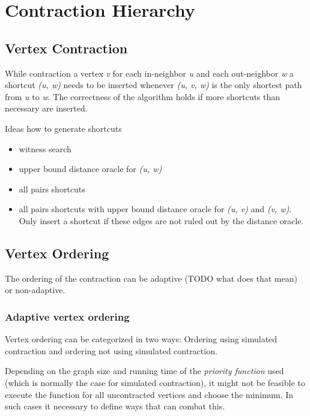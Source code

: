 \chapter{Contraction Hierarchy}



\section{Vertex Contraction}
While contraction a vertex \emph{v} for each in-neighbor \emph{u} and each out-neighbor \emph{w} a shortcut \emph{(u, w)} needs to be inserted whenever \emph{(u, v, w)} is the only shortest path from \emph{u} to \emph{w}.
The correctness of the algorithm holds if more shortcuts than necessary are inserted.

Ideas how to generate shortcuts
\begin{itemize}
      \item
            witness  search

      \item
            upper bound distance oracle for \emph{(u, w)}

      \item
            all pairs shortcuts

      \item
            all pairs shortcuts with upper bound distance oracle for \emph{(u, v)} and \emph{(v, w)}.
            Only insert a shortcut if these edges are not ruled out by the distance oracle.

\end{itemize}

\section{Vertex Ordering}
The ordering of the contraction can be adaptive (TODO what does that mean) or non-adaptive.

\subsection{Adaptive vertex ordering}
Vertex ordering can be categorized in two ways: Ordering using simulated contraction and ordering not using simulated contraction.

Depending on the graph size and running time of the \emph{priority function} used (which is normally the case for simulated contraction), it might not be feasible to execute the function for all uncontracted vertices and choose the minimum.
In such cases it necessary to define ways that can combat this.

